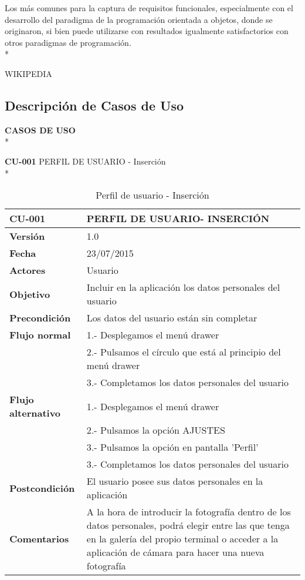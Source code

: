 \documentclass[../pfc.tex]{subfiles}
\begin{document}
	Los más comunes para la captura de requisitos funcionales, especialmente con el desarrollo del paradigma de la programación orientada a objetos, donde se originaron, si bien puede utilizarse con resultados igualmente satisfactorios con otros paradigmas de programación.\\*
	
	WIKIPEDIA
	
	\clearpage

	\subsection{Descripción de Casos de Uso}
	
	\textbf{CASOS DE USO}\\*
	
	\textbf{CU-001} PERFIL DE USUARIO - Inserción\\*
	
	\begin{table}[H]
		\centering
		\begin{tabular}[t]{|p{3cm}|p{9.5cm}|}
				\hline \textbf{CU-001} & \textbf{PERFIL DE USUARIO- INSERCIÓN} \\*
				\hline\hline \textbf{Versión} & 1.0 \\*
				\hline\hline \textbf{Fecha} & 23/07/2015 \\*
				\hline\textbf{Actores} 	& Usuario\\*
				\hline \textbf{Objetivo} & Incluir en la aplicación los datos personales del usuario\\* 			
				\hline \textbf{Precondición} & Los datos del usuario están sin completar \\* 
				\hline \textbf{Flujo normal} & 1.- Desplegamos el menú drawer \\* 
											 & 2.- Pulsamos el círculo que está al principio del menú drawer \\*	
											 & 3.- Completamos los datos personales del usuario\\*	
				\hline \textbf{Flujo alternativo} & 1.- Desplegamos el menú drawer \\* 
 												  & 2.- Pulsamos la opción AJUSTES \\*	
												  & 3.- Pulsamos la opción en pantalla 'Perfil' \\*	
												  & 3.- Completamos los datos personales del usuario \\*	
				\hline \textbf{Postcondición} & El usuario posee sus datos personales en la aplicación \\* 
				\hline \textbf{Comentarios}   & A la hora de introducir la fotografía dentro de los datos personales, podrá elegir entre las que tenga en la galería del propio terminal o acceder a la aplicación de cámara para hacer una nueva fotografía\\*
				\hline
			\end{tabular}
			\caption{Perfil de usuario - Inserción}
			\label{tabla:caso001}
	\end{table}
		
\end{document}
